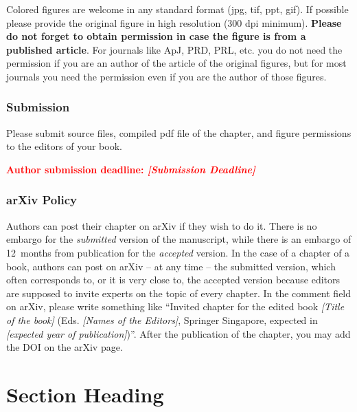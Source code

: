 \documentclass[graybox, envcountchap]{svmult}
\begin{document}
Colored figures are welcome in any standard format (jpg, tif, ppt, gif). If possible please provide the original figure in high resolution (300 dpi minimum). {\color{red}\bf Please do not forget to obtain permission in case the figure is from a published article}. For journals like ApJ, PRD, PRL, etc. you do not need the permission if you are an author of the article of the original figures, but for most journals you need the permission even if you are the author of those figures.



\subsubsection*{Submission}

Please submit source files, compiled pdf file of the chapter, and figure permissions to the editors of your book.

\vspace{0.3cm}

\textcolor{red}{\bf Author submission deadline: {\it [Submission Deadline]}}



\subsubsection*{arXiv Policy}

Authors can post their chapter on arXiv if they wish to do it. There is no embargo for the {\it submitted} version of the manuscript, while there is an embargo of 12~months from publication for the {\it accepted} version. In the case of a chapter of a book, authors can post on arXiv -- at any time -- the submitted version, which often corresponds to, or it is very close to, the accepted version because editors are supposed to invite experts on the topic of every chapter. In the comment field on arXiv, please write something like ``Invited chapter for the edited book {\it [Title of the book]} (Eds. {\it [Names of the Editors]}, Springer Singapore, expected in {\it [expected year of publication]})''. After the publication of the chapter, you may add the DOI on the arXiv page.










\section{Section Heading}
\label{sec:2}
\end{document}
